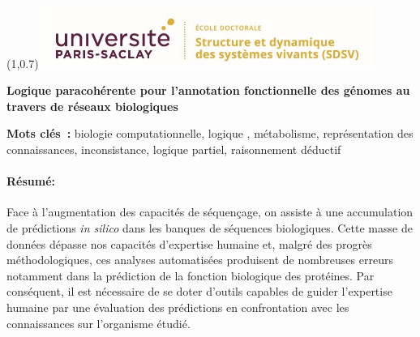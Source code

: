 \documentclass[univ]{thesis}
\begin{document}
    \thispagestyle{empty}
    \begin{textblock}{3}(1,0.7)
        \includegraphics[height=2cm]{img/logo_ecole_doctorale.png}
    \end{textblock}
    \begin{mdframed}[linecolor=psviolet, linewidth=2pt, innerleftmargin=10, innerrightmargin=30, innertopmargin=10, innerbottommargin=50, font=\tiny]
        {\small \textbf{Logique paracohérente pour l’annotation fonctionnelle des génomes au travers de réseaux biologiques}}
        
        \noindent\textbf{Mots clés :} biologie computationnelle, logique , métabolisme, représentation des connaissances, inconsistance, logique partiel, raisonnement déductif
        
        \begin{multicols}{2}            
            \paragraph{\textbf{Résumé:} }Face à l’augmentation des capacités de séquençage, on assiste à une accumulation de prédictions \textit{in silico} dans les banques de séquences biologiques. Cette masse de données dépasse nos capacités d’expertise humaine et, malgré des progrès méthodologiques, ces analyses automatisées produisent de nombreuses erreurs notamment dans la prédiction de la fonction biologique des protéines. Par conséquent, il est nécessaire de se doter d’outils capables de guider l’expertise humaine par une évaluation des prédictions en confrontation avec les connaissances sur l’organisme étudié. 
            

\end{multicols}
\end{mdframed}
\end{document}
